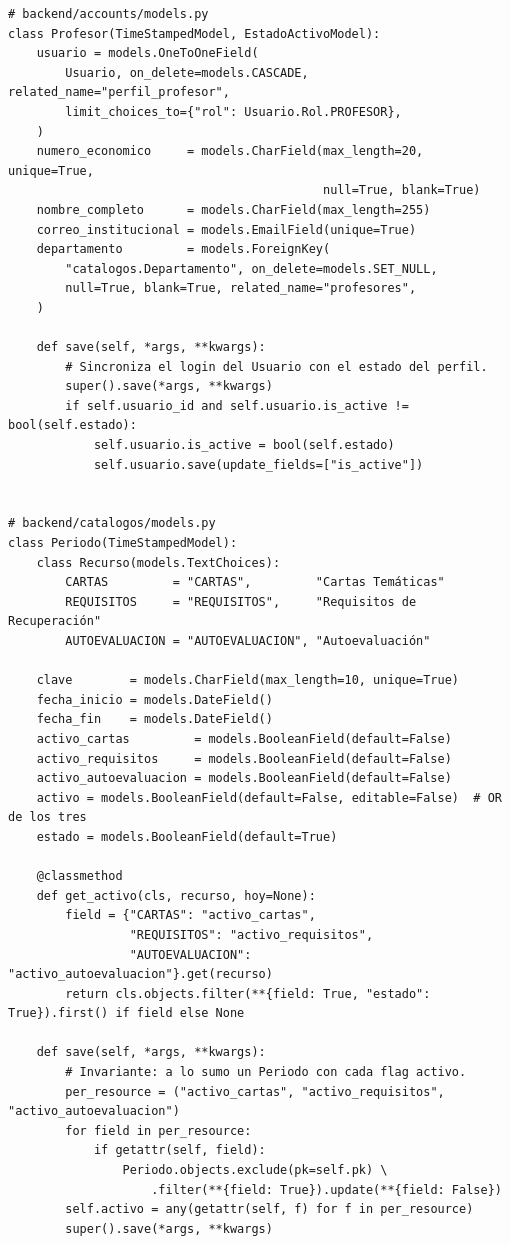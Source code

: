 \begin{lstlisting}[language={[3]Python}]
# backend/accounts/models.py
class Profesor(TimeStampedModel, EstadoActivoModel):
    usuario = models.OneToOneField(
        Usuario, on_delete=models.CASCADE, related_name="perfil_profesor",
        limit_choices_to={"rol": Usuario.Rol.PROFESOR},
    )
    numero_economico     = models.CharField(max_length=20, unique=True,
                                            null=True, blank=True)
    nombre_completo      = models.CharField(max_length=255)
    correo_institucional = models.EmailField(unique=True)
    departamento         = models.ForeignKey(
        "catalogos.Departamento", on_delete=models.SET_NULL,
        null=True, blank=True, related_name="profesores",
    )

    def save(self, *args, **kwargs):
        # Sincroniza el login del Usuario con el estado del perfil.
        super().save(*args, **kwargs)
        if self.usuario_id and self.usuario.is_active != bool(self.estado):
            self.usuario.is_active = bool(self.estado)
            self.usuario.save(update_fields=["is_active"])


# backend/catalogos/models.py
class Periodo(TimeStampedModel):
    class Recurso(models.TextChoices):
        CARTAS         = "CARTAS",         "Cartas Temáticas"
        REQUISITOS     = "REQUISITOS",     "Requisitos de Recuperación"
        AUTOEVALUACION = "AUTOEVALUACION", "Autoevaluación"

    clave        = models.CharField(max_length=10, unique=True)
    fecha_inicio = models.DateField()
    fecha_fin    = models.DateField()
    activo_cartas         = models.BooleanField(default=False)
    activo_requisitos     = models.BooleanField(default=False)
    activo_autoevaluacion = models.BooleanField(default=False)
    activo = models.BooleanField(default=False, editable=False)  # OR de los tres
    estado = models.BooleanField(default=True)

    @classmethod
    def get_activo(cls, recurso, hoy=None):
        field = {"CARTAS": "activo_cartas",
                 "REQUISITOS": "activo_requisitos",
                 "AUTOEVALUACION": "activo_autoevaluacion"}.get(recurso)
        return cls.objects.filter(**{field: True, "estado": True}).first() if field else None

    def save(self, *args, **kwargs):
        # Invariante: a lo sumo un Periodo con cada flag activo.
        per_resource = ("activo_cartas", "activo_requisitos", "activo_autoevaluacion")
        for field in per_resource:
            if getattr(self, field):
                Periodo.objects.exclude(pk=self.pk) \
                    .filter(**{field: True}).update(**{field: False})
        self.activo = any(getattr(self, f) for f in per_resource)
        super().save(*args, **kwargs)
\end{lstlisting}

